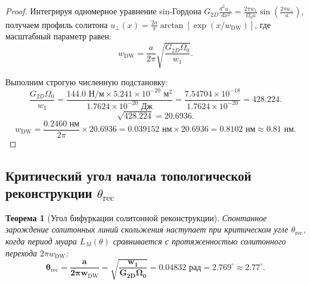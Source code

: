 \documentclass[12pt,a4paper]{article}
\newtheorem{theorem}{Теорема}
\begin{document}
\begin{proof}
	Интегрируя одномерное уравнение sin-Гордона $G_{2D} \frac{d^2 u_\perp}{dx^2} = \frac{2\pi w_1}{\Omega_0 a} \sin\left(\frac{2\pi u_\perp}{a}\right)$, получаем профиль солитона $u_\perp(x) = \frac{2a}{\pi} \arctan[\exp(x/w_{\text{DW}})]$, где масштабный параметр равен:
	\begin{equation}
		w_{\text{DW}} = \frac{a}{2\pi} \sqrt{\frac{G_{2D} \Omega_0}{w_1}}.
	\end{equation}
	
	Выполним строгую численную подстановку:
	\begin{equation}
		\frac{G_{2D} \Omega_0}{w_1} = \frac{144.0\text{ Н/м} \times 5.241 \times 10^{-20}\text{ м}^2}{1.7624 \times 10^{-20}\text{ Дж}} = \frac{7.54704 \times 10^{-18}}{1.7624 \times 10^{-20}} = \mathbf{428.224}.
	\end{equation}
	\begin{equation}
		\sqrt{428.224} = \mathbf{20.6936}.
	\end{equation}
	\begin{equation}
		w_{\text{DW}} = \frac{0.2460\text{ нм}}{2\pi} \times 20.6936 = 0.039152\text{ нм} \times 20.6936 = \mathbf{0.8102\text{ нм}} \approx \mathbf{0.81\text{ нм}}.
	\end{equation}
\end{proof}

\subsection{Критический угол начала топологической реконструкции $\theta_{\text{rec}}$}
\begin{theorem}[Угол бифуркации солитонной реконструкции]
	Спонтанное зарождение солитонных линий скольжения наступает при критическом угле $\theta_{\mathrm{rec}}$, когда период муара $L_M(\theta)$ сравнивается с протяженностью солитонного перехода $2\pi w_{\mathrm{DW}}$:
	\begin{equation}
		\mathbf{\theta_{\mathrm{rec}} = \frac{a}{2\pi w_{\mathrm{DW}}} = \sqrt{\frac{w_1}{G_{2D} \Omega_0}} = \mathbf{0.04832\text{ рад}} = \mathbf{2.769^\circ \approx 2.77^\circ}}.
	\end{equation}
\end{theorem}
\end{document}
